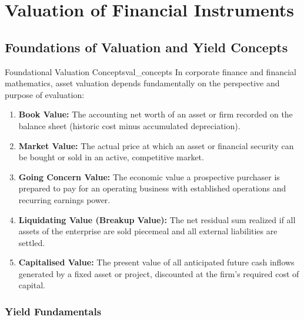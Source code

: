 \chapter{Valuation of Financial Instruments}

\section{Foundations of Valuation and Yield Concepts}

\begin{definition}{Foundational Valuation Concepts}{val_concepts}
In corporate finance and financial mathematics, asset valuation depends fundamentally on the perspective and purpose of evaluation:
\begin{enumerate}[leftmargin=*]
    \item \textbf{Book Value:} The accounting net worth of an asset or firm recorded on the balance sheet (historic cost minus accumulated depreciation).
    \item \textbf{Market Value:} The actual price at which an asset or financial security can be bought or sold in an active, competitive market.
    \item \textbf{Going Concern Value:} The economic value a prospective purchaser is prepared to pay for an operating business with established operations and recurring earnings power.
    \item \textbf{Liquidating Value (Breakup Value):} The net residual sum realized if all assets of the enterprise are sold piecemeal and all external liabilities are settled.
    \item \textbf{Capitalised Value:} The present value of all anticipated future cash inflows generated by a fixed asset or project, discounted at the firm's required cost of capital.
\end{enumerate}
\end{definition}

\subsection{Yield Fundamentals}

